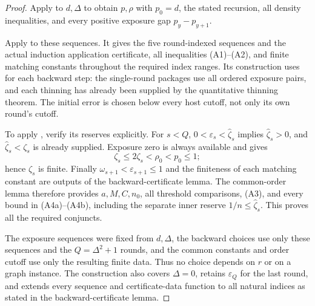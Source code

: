 \begin{proof}
Apply  to $d,\Delta$ to obtain
$p,\rho$ with $p_0=d$, the stated recursion, all density inequalities,
and every positive exposure gap $p_y-p_{y+1}$.

Apply  to these sequences.
It gives the five round-indexed sequences and the actual induction
application certificate, all inequalities (A1)--(A2), and finite
matching constants throughout the required index ranges. Its construction
uses  for each backward step: the
single-round packages use all ordered exposure pairs, and each thinning
has already been supplied by the quantitative thinning theorem. The
initial error is chosen below every host cutoff, not only its own
round's cutoff.

To apply , verify its reserves
explicitly. For $s<Q$, $0<\varepsilon_s<\widehat\zeta_s$ implies
$\widehat\zeta_s>0$, and $\widehat\zeta_s<\zeta_s$ is already supplied.
Exposure zero is always available and gives
\[
 \zeta_s\leq2\zeta_s<\rho_0<p_0\leq1;
\]
hence $\zeta_s$ is finite. Finally
$\omega_{s+1}<\varepsilon_{s+1}\leq1$ and the finiteness of each matching
constant are outputs of the backward-certificate lemma.
The common-order lemma therefore provides $a,M,C,n_0$, all threshold
comparisons, (A3), and every bound in (A4a)--(A4b), including the separate
inner reserve $1/n\leq\widehat\zeta_s$. This proves all the required
conjuncts.

The exposure sequences were fixed from $d,\Delta$, the backward choices
use only these sequences and the $Q=\Delta^2+1$ rounds, and the common
constants and order cutoff use only the resulting finite data.
Thus no choice depends on $r$ or on a graph instance. The construction
also covers $\Delta=0$, retains $\varepsilon_Q$ for the last round, and
extends every sequence and certificate-data function to all natural
indices as stated in the backward-certificate lemma.
\end{proof}
